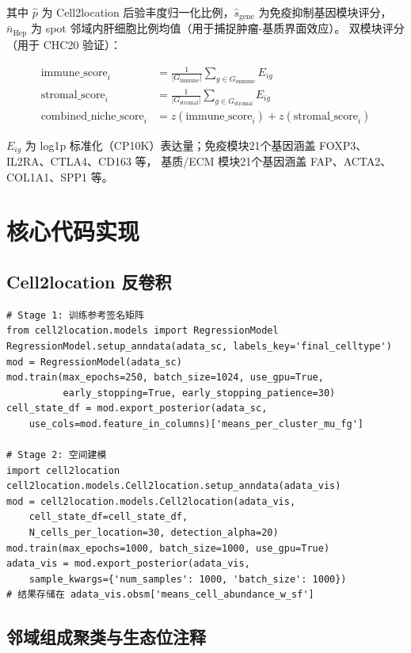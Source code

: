 \documentclass[12pt, a4paper]{ctexart}
\begin{document}
其中 $\hat{p}$ 为 Cell2location 后验丰度归一化比例，$\hat{s}_{\text{gene}}$ 为免疫抑制基因模块评分，
$\bar{n}_{\text{Hep}}$ 为 spot 邻域内肝细胞比例均值（用于捕捉肿瘤-基质界面效应）。
双模块评分（用于 CHC20 验证）：

\begin{align}
\text{immune\_score}_i &= \frac{1}{|G_{\text{immune}}|}\sum_{g \in G_{\text{immune}}} E_{ig} \\
\text{stromal\_score}_i &= \frac{1}{|G_{\text{stromal}}|}\sum_{g \in G_{\text{stromal}}} E_{ig} \\
\text{combined\_niche\_score}_i &= z(\text{immune\_score}_i) + z(\text{stromal\_score}_i)
\end{align}

$E_{ig}$ 为 log1p 标准化（CP10K）表达量；免疫模块21个基因涵盖 FOXP3、IL2RA、CTLA4、CD163 等，
基质/ECM 模块21个基因涵盖 FAP、ACTA2、COL1A1、SPP1 等。

\section{核心代码实现}
\label{app:code}

\subsection{Cell2location 反卷积}

\begin{lstlisting}[caption={RegressionModel 训练与空间建模核心代码}]
# Stage 1: 训练参考签名矩阵
from cell2location.models import RegressionModel
RegressionModel.setup_anndata(adata_sc, labels_key='final_celltype')
mod = RegressionModel(adata_sc)
mod.train(max_epochs=250, batch_size=1024, use_gpu=True,
          early_stopping=True, early_stopping_patience=30)
cell_state_df = mod.export_posterior(adata_sc,
    use_cols=mod.feature_in_columns)['means_per_cluster_mu_fg']

# Stage 2: 空间建模
import cell2location
cell2location.models.Cell2location.setup_anndata(adata_vis)
mod = cell2location.models.Cell2location(adata_vis,
    cell_state_df=cell_state_df,
    N_cells_per_location=30, detection_alpha=20)
mod.train(max_epochs=1000, batch_size=1000, use_gpu=True)
adata_vis = mod.export_posterior(adata_vis,
    sample_kwargs={'num_samples': 1000, 'batch_size': 1000})
# 结果存储在 adata_vis.obsm['means_cell_abundance_w_sf']
\end{lstlisting}

\subsection{邻域组成聚类与生态位注释}
\end{document}
